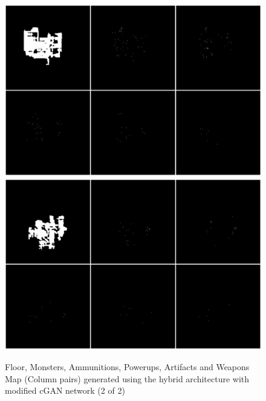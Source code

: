 \documentclass{Configuration_Files/PoliMi3i_thesis}
\begin{document}
\begin{figure}[H]
    \centering
    \includegraphics[width=1\textwidth]{mod_cgan_sample3.jpg}
    \includegraphics[width=1\textwidth]{mod_cgan_sample4.jpg}
    \caption[Samples generated using the modified cGAN network (2 of 2)]{Floor, Monsters, Ammunitions, Powerups, Artifacts and Weapons Map 
(Column pairs) generated using the hybrid architecture with modified cGAN network (2 of 2)}
    \label{fig:modcgansample2}
\end{figure}
\end{document}
